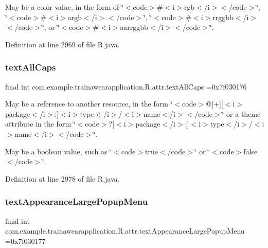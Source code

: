 May be a color value, in the form of \char`\"{}$<$code$>$\#$<$i$>$rgb$<$/i$>$$<$/code$>$\char`\"{}, \char`\"{}$<$code$>$\#$<$i$>$argb$<$/i$>$$<$/code$>$\char`\"{}, \char`\"{}$<$code$>$\#$<$i$>$rrggbb$<$/i$>$$<$/code$>$\char`\"{}, or \char`\"{}$<$code$>$\#$<$i$>$aarrggbb$<$/i$>$$<$/code$>$\char`\"{}. 

Definition at line 2969 of file R.\+java.

\mbox{\label{classcom_1_1example_1_1trainawearapplication_1_1_r_1_1attr_a2796ae383c1b37f83e5aded2b42d9b06}} 
\subsubsection{\texorpdfstring{textAllCaps}{textAllCaps}}
{\footnotesize\ttfamily final int com.\+example.\+trainawearapplication.\+R.\+attr.\+text\+All\+Caps =0x7f030176\hspace{0.3cm}{\ttfamily [static]}}

May be a reference to another resource, in the form \char`\"{}$<$code$>$@\mbox{[}+\mbox{]}\mbox{[}$<$i$>$package$<$/i$>$\+:\mbox{]}$<$i$>$type$<$/i$>$/$<$i$>$name$<$/i$>$$<$/code$>$\char`\"{} or a theme attribute in the form \char`\"{}$<$code$>$?\mbox{[}$<$i$>$package$<$/i$>$\+:\mbox{]}$<$i$>$type$<$/i$>$/$<$i$>$name$<$/i$>$$<$/code$>$\char`\"{}. 

May be a boolean value, such as \char`\"{}$<$code$>$true$<$/code$>$\char`\"{} or \char`\"{}$<$code$>$false$<$/code$>$\char`\"{}. 

Definition at line 2978 of file R.\+java.

\mbox{\label{classcom_1_1example_1_1trainawearapplication_1_1_r_1_1attr_aa937402e4ec73262dffec8b74443322a}} 
\subsubsection{\texorpdfstring{textAppearanceLargePopupMenu}{textAppearanceLargePopupMenu}}
{\footnotesize\ttfamily final int com.\+example.\+trainawearapplication.\+R.\+attr.\+text\+Appearance\+Large\+Popup\+Menu =0x7f030177\hspace{0.3cm}{\ttfamily [static]}}


